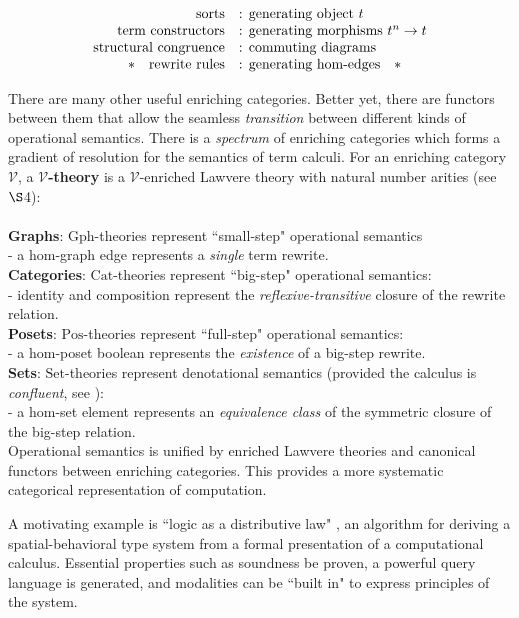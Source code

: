 \documentclass[a4paper,UKenglish]{article}
\theoremstyle{definition}
\newcommand{\Gph}{\mathrm{Gph}}
\newcommand{\Set}{\mathrm{Set}}
\newcommand{\Cat}{\mathrm{Cat}}
\newcommand{\Pos}{\mathrm{Pos}}
\newcommand{\V}{\mathscr{V}}
\begin{document}
\[\begin{array}{rl}
\text{sorts} & \text{: generating object } t\\
\text{term constructors} & \text{: generating morphisms } t^n \to t\\
\text{structural congruence} & \text{: commuting diagrams}\\
\text{\textasteriskcentered \quad rewrite rules} & \text{: generating hom-edges\quad\textasteriskcentered}\\
\end{array}\]

There are many other useful enriching categories. Better yet, there are functors between them that allow the seamless \textit{transition} between different kinds of operational semantics. There is a \textit{spectrum} of enriching categories which forms a gradient of resolution for the semantics of term calculi. For an enriching category $\V$, a \textbf{$\V$-theory} is a $\V$-enriched Lawvere theory with natural number arities (see $\S$4):\\\\
\textbf{Graphs}: $\Gph$-theories represent ``small-step" operational semantics\\ - a hom-graph edge represents a \textit{single} term rewrite.\\
\textbf{Categories}: $\Cat$-theories represent ``big-step" operational semantics:\\ - identity and composition represent the \textit{reflexive-transitive} closure of the rewrite relation.\\
\textbf{Posets}: $\Pos$-theories represent ``full-step" operational semantics:\\ - a hom-poset boolean represents the \textit{existence} of a big-step rewrite.\\
\textbf{Sets}: $\Set$-theories represent denotational semantics (provided the calculus is \textit{confluent}, see \cite{lam}):\\ - a hom-set element represents an \textit{equivalence class} of the symmetric closure of the big-step relation.\\

Operational semantics is unified by enriched Lawvere theories and canonical functors between enriching categories. This provides a more systematic categorical representation of computation.

A motivating example is ``logic as a distributive law" \cite{ladl}, an algorithm for deriving a spatial-behavioral type system from a formal presentation of a computational calculus. Essential properties such as soundness be proven, a powerful query language is generated, and modalities can be ``built in" to express principles of the system.
\end{document}
